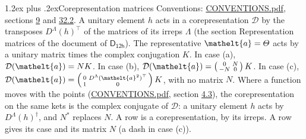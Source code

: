 \documentclass[10pt,a4paper]{article}
\makeatletter
\renewcommand\section{\@startsection{section}{1}{\z@}{-3ex plus -1ex minus -.2ex}%
  {1.2ex plus .2ex}{\normalfont\large\sffamily\bfseries\color{parttitle}}}
\numberwithin{equation}{section}
\newcommand{\eltfont}[1]{{\let\sigma\eltsigma\mathelt{#1}}}
\newcommand{\grp}[1]{\mathsf{#1}}
\newcommand{\elt}[1]{\eltfont{#1}}
\makeatother
\begin{document}
\section{Corepresentation matrices}\label{s:corep_matrices}
Conventions: \href{../../CONVENTIONS.pdf}{CONVENTIONS.pdf}, sections \href{../../../rotation/CONVENTIONS.pdf\#conv.9}{9} and \href{../../CONVENTIONS.pdf\#conv.32.2}{32.2}.
A unitary element $h$ acts in a corepresentation $\mathcal{D}$ by the transposes $D^{\Lambda}(h)^{\top}$ of the matrices of its irreps $\Lambda$ (the section Representation matrices of the document of \href{../../../rotation/data/pdf/D12h.pdf}{$\grp{D_{12h}}$}). The representative $\elt{a} = \varTheta$ acts by a unitary matrix times the complex conjugation $K$.
In case (a), $\mathcal{D}(\elt{a}) = NK$. In case (b), $\mathcal{D}(\elt{a}) = \left(\begin{smallmatrix} 0 & N \\ -N & 0 \end{smallmatrix}\right) K$. In case (c), $\mathcal{D}(\elt{a}) = \left(\begin{smallmatrix} 0 & D^{\Lambda}(\elt{a}^2)^{\top} \\ 1 & 0 \end{smallmatrix}\right) K$, with no matrix $N$.
Where a function moves with the points (\href{../../CONVENTIONS.pdf}{CONVENTIONS.pdf}, section \href{../../../rotation/CONVENTIONS.pdf\#conv.4.3}{4.3}), the corepresentation on the same kets is the complex conjugate of $\mathcal{D}$: a unitary element $h$ acts by $D^{\Lambda}(h)^{\dagger}$, and $N^{*}$ replaces $N$.
A row is a corepresentation, by its irreps. A row gives its case and its matrix $N$ (a dash in case (c)).
\end{document}
